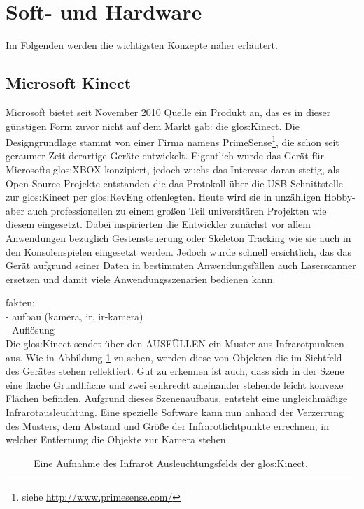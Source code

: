 \section{Soft- und Hardware}
\label{sec:softundhardware}

Im Folgenden werden die wichtigsten Konzepte näher erläutert.

\subsection{Microsoft Kinect}
\label{subsec:kinect}

Microsoft bietet seit November 2010 {\color{red}Quelle} ein Produkt an, das es in dieser günstigen Form zuvor nicht auf dem Markt gab: die \gls{glos:Kinect}. Die Designgrundlage stammt von einer Firma namens PrimeSense\footnote{siehe \url{http://www.primesense.com/}}, die schon seit geraumer Zeit derartige Geräte entwickelt. Eigentlich wurde das Gerät für Microsofts \gls{glos:XBOX} konzipiert, jedoch wuchs das Interesse daran stetig, als Open Source Projekte entstanden die das Protokoll über die USB-Schnittstelle zur \gls{glos:Kinect} per \gls{glos:RevEng} offenlegten. Heute wird sie in unzähligen Hobby- aber auch professionellen zu einem großen Teil universitären Projekten wie diesem eingesetzt. Dabei inspirierten die Entwickler zunächst vor allem Anwendungen bezüglich Gestensteuerung oder Skeleton Tracking wie sie auch in den Konsolenspielen eingesetzt werden. Jedoch wurde schnell ersichtlich, das das Gerät aufgrund seiner Daten in bestimmten Anwendungsfällen auch Laserscanner ersetzen und damit viele Anwendungsszenarien bedienen kann.

{\color{red}fakten:}\\

{\color{red}- aufbau (kamera, ir, ir-kamera)}\\
{\color{red}- Auflösung}\\

Die \gls{glos:Kinect} sendet über den {\color{red}AUSFÜLLEN} ein Muster aus Infrarotpunkten aus. Wie in Abbildung \ref{fig:kinectIlluminator} zu sehen, werden diese von Objekten die im Sichtfeld des Gerätes stehen reflektiert. Gut zu erkennen ist auch, dass sich in der Szene eine flache Grundfläche und zwei senkrecht aneinander stehende leicht konvexe Flächen befinden. Aufgrund dieses Szenenaufbaus, entsteht eine ungleichmäßige Infrarotausleuchtung. Eine spezielle Software kann nun anhand der Verzerrung des Musters, dem Abstand und Größe der Infrarotlichtpunkte errechnen, in welcher Entfernung die Objekte zur Kamera stehen.
\begin{figure}[t]
	\centering
	\caption[Kinect Infrarot Feld]{Eine Aufnahme des Infrarot Ausleuchtungsfelds der \gls{glos:Kinect}.}
	\label{fig:kinectIlluminator}
\end{figure}

